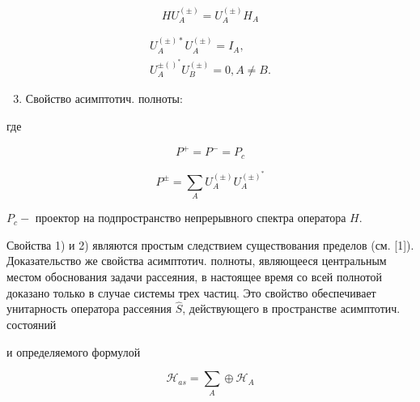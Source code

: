 \documentclass[10pt]{article}
\begin{document}
\[

H U_{A}^{( \pm)}=U_{A}^{( \pm)} H_{A}

\]



\[

\begin{gathered}

U_{A}^{( \pm) *} U_{A}^{( \pm)}=I_{A}, \\

U_{A}^{ \pm()^{*}} U_{B}^{( \pm)}=0, A \neq B .

\end{gathered}

\]



\begin{enumerate}

  \setcounter{enumi}{2}

  \item Свойство асимптотич. полноты:

\end{enumerate}



где



\[

P^{+}=P^{-}=P_{c}

\]



\[

P^{ \pm}=\sum_{A} U_{A}^{( \pm)} U_{A}^{( \pm)^{*}}

\]



$P_{c}-$ проектор на подпространство непрерывного спектра оператора $H$.



Свойства 1) и 2) являются простым следствием существования пределов (см. [1]). Доказательство же свойства асимптотич. полноты, являющееся центральным местом обоснования задачи рассеяния, в настоящее время со всей полнотой доказано только в случае системы трех частиц. Это свойство обеспечивает унитарность оператора рассеяния $\hat{S}$, действующего в пространстве асимптотич. состояний



и определяемого формулой



\[

\mathscr{H}_{a s}=\sum_{A} \oplus \mathscr{H}_{A}

\]
\end{document}
